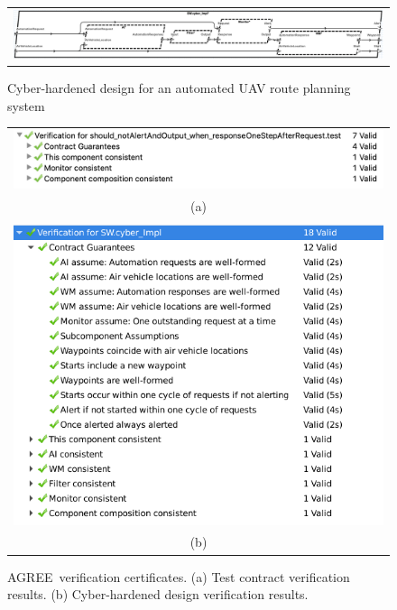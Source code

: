 \documentclass[global,twocolumn]{svjour}
\newcommand{\agr}{AGREE}
\begin{document}
\begin{figure}
  \begin{center}
    \begin{tabular}{c}
      \includegraphics[width=2\columnwidth]{hardened.png}
    \end{tabular}
  \end{center}
  \caption{Cyber-hardened design for an automated UAV route planning system}
  \label{fig:hardened}
\end{figure}

\begin{figure}
  \begin{center}
    \begin{tabular}{c}
      \includegraphics[width=\columnwidth]{agree-test-output.png} \\
      (a) \\ \\
      \includegraphics[width=\columnwidth]{hardened-certificate.png} \\
      (b)
    \end{tabular}
  \end{center}
  \caption{\agr\ verification certificates. (a) Test contract verification results. (b) Cyber-hardened design verification results.}
  \label{fig:hardened-certificate}
\end{figure}
\end{document}
